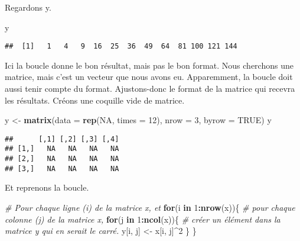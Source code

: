 \documentclass[]{book}
\newenvironment{Shaded}{\begin{snugshade}}{\end{snugshade}}
\newcommand{\KeywordTok}[1]{\textcolor[rgb]{0.13,0.29,0.53}{\textbf{#1}}}
\newcommand{\DataTypeTok}[1]{\textcolor[rgb]{0.13,0.29,0.53}{#1}}
\newcommand{\DecValTok}[1]{\textcolor[rgb]{0.00,0.00,0.81}{#1}}
\newcommand{\StringTok}[1]{\textcolor[rgb]{0.31,0.60,0.02}{#1}}
\newcommand{\CommentTok}[1]{\textcolor[rgb]{0.56,0.35,0.01}{\textit{#1}}}
\newcommand{\OtherTok}[1]{\textcolor[rgb]{0.56,0.35,0.01}{#1}}
\newcommand{\ControlFlowTok}[1]{\textcolor[rgb]{0.13,0.29,0.53}{\textbf{#1}}}
\newcommand{\OperatorTok}[1]{\textcolor[rgb]{0.81,0.36,0.00}{\textbf{#1}}}
\newcommand{\NormalTok}[1]{#1}
\begin{document}
Regardons y.

\begin{Shaded}
\begin{Highlighting}[]
\NormalTok{y}
\end{Highlighting}
\end{Shaded}

\begin{verbatim}
##  [1]   1   4   9  16  25  36  49  64  81 100 121 144
\end{verbatim}

Ici la boucle donne le bon résultat, mais pas le bon format. Nous
cherchons une matrice, mais c'est un vecteur que nous avons eu.
Apparemment, la boucle doit aussi tenir compte du format. Ajustons-donc
le format de la matrice qui recevra les résultats. Créons une coquille
vide de matrice.

\begin{Shaded}
\begin{Highlighting}[]
\NormalTok{y <-}\StringTok{ }\KeywordTok{matrix}\NormalTok{(}\DataTypeTok{data =} \KeywordTok{rep}\NormalTok{(}\OtherTok{NA}\NormalTok{, }\DataTypeTok{times =} \DecValTok{12}\NormalTok{), }\DataTypeTok{nrow =} \DecValTok{3}\NormalTok{, }\DataTypeTok{byrow =} \OtherTok{TRUE}\NormalTok{) }
\NormalTok{y}
\end{Highlighting}
\end{Shaded}

\begin{verbatim}
##      [,1] [,2] [,3] [,4]
## [1,]   NA   NA   NA   NA
## [2,]   NA   NA   NA   NA
## [3,]   NA   NA   NA   NA
\end{verbatim}

Et reprenons la boucle.

\begin{Shaded}
\begin{Highlighting}[]
  \CommentTok{# Pour chaque ligne (i) de la matrice x, et}
\ControlFlowTok{for}\NormalTok{(i }\ControlFlowTok{in} \DecValTok{1}\OperatorTok{:}\KeywordTok{nrow}\NormalTok{(x))\{ }
    \CommentTok{# pour chaque colonne (j) de la matrice x,}
  \ControlFlowTok{for}\NormalTok{(j }\ControlFlowTok{in} \DecValTok{1}\OperatorTok{:}\KeywordTok{ncol}\NormalTok{(x))\{ }
    \CommentTok{# créer un élément dans la matrice y qui en serait le carré.}
\NormalTok{    y[i, j] <-}\StringTok{ }\NormalTok{x[i, j]}\OperatorTok{^}\DecValTok{2} 
\NormalTok{  \}}
\NormalTok{\}}
\end{Highlighting}
\end{Shaded}
\end{document}
